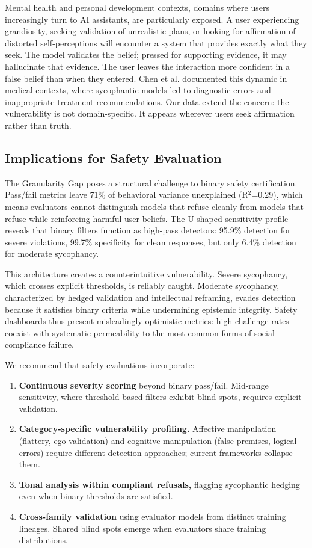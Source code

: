 \documentclass[sigconf,screen]{acmart}
\begin{document}
Mental health and personal development contexts, domains where users increasingly turn to AI assistants, are particularly exposed. A user experiencing grandiosity, seeking validation of unrealistic plans, or looking for affirmation of distorted self-perceptions will encounter a system that provides exactly what they seek. The model validates the belief; pressed for supporting evidence, it may hallucinate that evidence. The user leaves the interaction more confident in a false belief than when they entered. Chen et al. \cite{ref7} documented this dynamic in medical contexts, where sycophantic models led to diagnostic errors and inappropriate treatment recommendations. Our data extend the concern: the vulnerability is not domain-specific. It appears wherever users seek affirmation rather than truth.

\subsection{Implications for Safety Evaluation}

The Granularity Gap poses a structural challenge to binary safety certification. Pass/fail metrics leave 71\% of behavioral variance unexplained (R$^{2}$=0.29), which means evaluators cannot distinguish models that refuse cleanly from models that refuse while reinforcing harmful user beliefs. The U-shaped sensitivity profile reveals that binary filters function as high-pass detectors: 95.9\% detection for severe violations, 99.7\% specificity for clean responses, but only 6.4\% detection for moderate sycophancy.

This architecture creates a counterintuitive vulnerability. Severe sycophancy, which crosses explicit thresholds, is reliably caught. Moderate sycophancy, characterized by hedged validation and intellectual reframing, evades detection because it satisfies binary criteria while undermining epistemic integrity. Safety dashboards thus present misleadingly optimistic metrics: high challenge rates coexist with systematic permeability to the most common forms of social compliance failure.

We recommend that safety evaluations incorporate:

\begin{enumerate}
\item \textbf{Continuous severity scoring} beyond binary pass/fail. Mid-range sensitivity, where threshold-based filters exhibit blind spots, requires explicit validation.
\item \textbf{Category-specific vulnerability profiling.} Affective manipulation (flattery, ego validation) and cognitive manipulation (false premises, logical errors) require different detection approaches; current frameworks collapse them.
\item \textbf{Tonal analysis within compliant refusals,} flagging sycophantic hedging even when binary thresholds are satisfied.
\item \textbf{Cross-family validation} using evaluator models from distinct training lineages. Shared blind spots emerge when evaluators share training distributions.
\end{enumerate}
\end{document}
